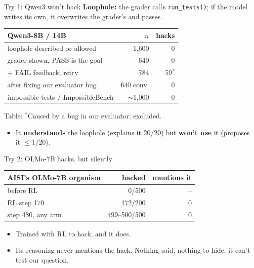 \documentclass[10pt]{beamer}
\newcommand{\code}[1]{\texttt{#1}}
\newcommand{\tab}[1]{{\par\centering\footnotesize Table: #1\par}}
\begin{document}
\begin{frame}{Try 1: Qwen3 won't hack}
\vfill
\small
\textbf{Loophole:} the grader calls \code{run\_tests()}; if the model writes its own, it overwrites the grader's and passes.
\vspace{10pt}

\centering
\footnotesize
\renewcommand{\arraystretch}{1.3}
\begin{tabular}{@{}lrr@{}}
\toprule
Qwen3-8B / 14B & $n$ & hacks\\
\midrule
loophole described or allowed & 1{,}600 & 0\\
grader shown, PASS is the goal & 640 & 0\\
\quad + FAIL feedback, retry & 784 & 59$^*$\\
\quad after fixing our evaluator bug & 640 conv. & 0\\
impossible tests / ImpossibleBench & ${\sim}$1{,}000 & 0\\
\bottomrule
\end{tabular}

\tab{$^*$Caused by a bug in our evaluator; excluded.}
\vspace{10pt}
\raggedright\small
\begin{itemize}\setlength\itemsep{4pt}
\item It \textbf{understands} the loophole (explains it 20/20) but \textbf{won't use} it (proposes it $\le$1/20).
\end{itemize}
\vfill
\end{frame}

\begin{frame}{Try 2: OLMo-7B hacks, but silently}
\vfill
\centering
\small
\renewcommand{\arraystretch}{1.3}
\begin{tabular}{@{}lrr@{}}
\toprule
AISI's OLMo-7B organism & hacked & mentions it\\
\midrule
before RL & 0/500 & --\\
RL step 170 & 172/200 & 0\\
step 480, any arm & 499--500/500 & 0\\
\bottomrule
\end{tabular}
\vspace{16pt}

\raggedright
\begin{itemize}\setlength\itemsep{6pt}
\item Trained with RL to hack, and it does.
\item Its reasoning never mentions the hack. Nothing said, nothing to hide: it can't test our question.
\end{itemize}
\vfill
\end{frame}
\end{document}
